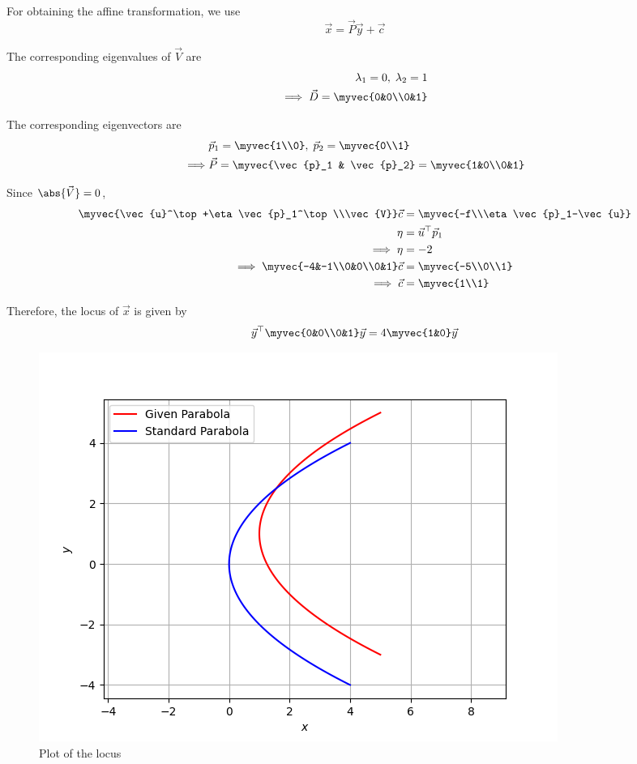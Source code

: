 For obtaining the affine transformation, we use 
\begin{equation}
    \vec{x} = \vec{P}\vec{y}+\vec{c}
\end{equation}

The corresponding eigenvalues of $\vec{V}$ are
\begin{align}
    \lambda_1 = 0,\; \lambda_2 = 1\\
    \implies \vec{D} = \myvec{0&0\\0&1}
\end{align}

The corresponding eigenvectors are
\begin{align}
    &\vec{p}_1 = \myvec{1\\0},\; \vec{p}_2 = \myvec{0\\1}\\
    \implies &\vec{P} = \myvec{\vec{p}_1 & \vec{p}_2} = \myvec{1&0\\0&1}
\end{align}

Since $\abs{\vec{V}} = 0$,
\begin{align}
    \myvec{\vec{u}^\top+\eta \vec{p}_1^\top\\\vec{V}}\vec{c} &= \myvec{-f\\\eta \vec{p}_1-\vec{u}}\\
    \eta &= \vec{u}^\top \vec{p}_1\\
    \implies \eta &= -2\\
    \implies \myvec{-4&-1\\0&0\\0&1}\vec{c} &= \myvec{-5\\0\\1}\\
    \implies \vec{c} &= \myvec{1\\1}
\end{align}

Therefore, the locus of $\vec{x}$ is given by
\begin{align}
    \vec{y}^\top \myvec{0&0\\0&1}\vec{y} = 4\myvec{1&0}\vec{y}
\end{align}

\begin{figure}[h]
    \centering
    \includegraphics[width=\columnwidth]{solutions/1/2/4/figures/figure.png}
    \caption{Plot of the locus}
    \label{1/2/4fig}
\end{figure}
